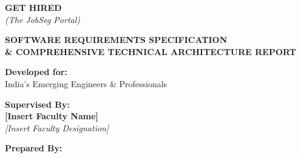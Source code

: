 \documentclass[12pt,a4paper,oneside]{report}
\begin{document}

\begin{titlepage}
    \begin{center}
        \vspace*{2cm}
        
        {\Huge \textbf{GET HIRED}} \\
        \vspace{0.3cm}
        {\Large \textit{(The JobSeg Portal)}}
        
        \vspace{1.5cm}
        {\Large \textbf{SOFTWARE REQUIREMENTS SPECIFICATION}} \\
        \vspace{0.2cm}
        {\normalsize \textbf{\& COMPREHENSIVE TECHNICAL ARCHITECTURE REPORT}}
        
        \vspace{2cm}
        
        \textbf{Developed for:} \\
        \vspace{0.2cm}
        India's Emerging Engineers \& Professionals
        
        \vspace{1.5cm}
        
        {\large \textbf{Supervised By:}} \\
        \vspace{0.1cm}
        {\large \textbf{[Insert Faculty Name]}} \\
        \textit{[Insert Faculty Designation]} \\
        
        \vspace{1.5cm}
        
        {\large \textbf{Prepared By:}} \\
        \vspace{0.5cm}
        

\end{center}
\end{titlepage}
\end{document}
